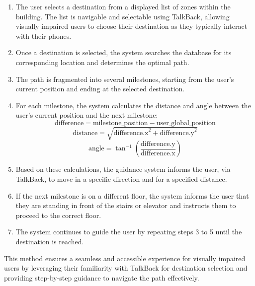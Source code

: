 \begin{enumerate}
	\item The user selects a destination from a displayed list of zones within the building. The list is navigable and selectable using TalkBack, allowing visually impaired users to choose their destination as they typically interact with their phones.
	\item Once a destination is selected, the system searches the database for its corresponding location and determines the optimal path.
	\item The path is fragmented into several milestones, starting from the user's current position and ending at the selected destination.
	\item For each milestone, the system calculates the distance and angle between the user's current position and the next milestone:
	\begin{equation}
		\text{difference} = \text{milestone\_position} - \text{user\_global\_position}
		\nonumber\end{equation}
	\begin{equation}
		\text{distance} = \sqrt{\text{difference.x}^2 + \text{difference.y}^2}
		\nonumber\end{equation}
	\begin{equation}
		\text{angle} = \tan^{-1}\left(\frac{\text{difference.y}}{\text{difference.x}}\right)
		\nonumber\end{equation}
	\item Based on these calculations, the guidance system informs the user, via TalkBack, to move in a specific direction and for a specified distance.
	\item If the next milestone is on a different floor, the system informs the user that they are standing in front of the stairs or elevator and instructs them to proceed to the correct floor.
	\item The system continues to guide the user by repeating steps 3 to 5 until the destination is reached.
\end{enumerate}

This method ensures a seamless and accessible experience for visually impaired users by leveraging their familiarity with TalkBack for destination selection and providing step-by-step guidance to navigate the path effectively.

